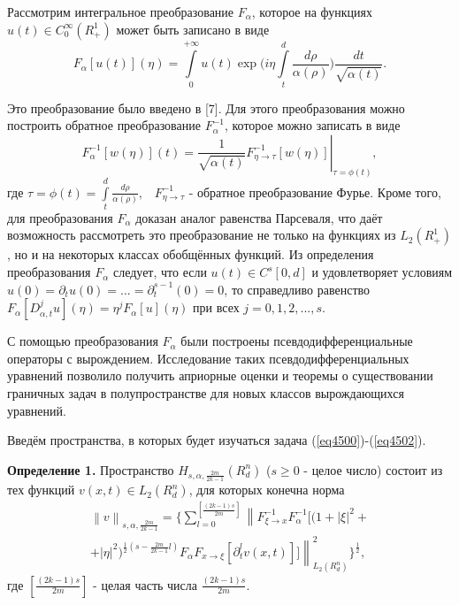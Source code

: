 Рассмотрим интегральное преобразование $F_\alpha $, которое на функциях
$u(t) \in C_0^\infty (R_ + ^1 )$ может быть записано в виде
\[
F_\alpha [u(t)](\eta ) = \int\limits_0^{ + \infty } {u(t)\exp (i\eta }
\int\limits_t^d {\frac{d\rho }{\alpha (\rho )}} )\frac{dt}{\sqrt {\alpha
(t)} }.
\]

Это преобразование было введено в [7]. Для этого преобразования можно
построить обратное преобразование $F_\alpha ^{ - 1} $, которое можно
записать в виде
$$F_\alpha ^{ - 1} [w(\eta )](t) = \left. {\frac{1}{\sqrt
{\alpha (t)} }F_{\eta \to \tau }^{ - 1} [w(\eta )]} \right|_{\tau = \phi
(t)} ,$$ где $\tau = \phi (t) = \int\limits_t^d {\frac{d\rho }{\alpha (\rho
)}} ,\,\,\,\,\,F_{\eta \to \tau }^{ - 1} $ - обратное преобразование Фурье.
Кроме того, для преобразования $F_\alpha $ доказан аналог равенства
Парсеваля, что даёт возможность рассмотреть это преобразование не только на
функциях из $L_2 (R_ + ^1 )$, но и на некоторых классах обобщённых функций.
Из определения преобразования $F_\alpha $ следует, что если $u\left( t
\right) \in C^s\left[ {0,d} \right]$ и удовлетворяет условиям $u\left( 0
\right) = \partial _t u\left( 0 \right) = ... = \partial _t^{s - 1} \left( 0
\right) = 0$,
то справедливо равенство $F_\alpha \left[ {D_{\alpha ,t}^j u} \right]\left(
\eta \right) = \eta ^jF_\alpha \left[ u \right]\left( \eta \right)$ при всех
$j = 0,1,2,...,s$.

С помощью преобразования $F_\alpha $ были построены псевдодифференциальные
операторы с вырождением. Исследование таких псевдодифференциальных уравнений
позволило получить априорные оценки и теоремы о существовании граничных
задач в полупространстве для новых классов вырождающихся уравнений.

Введём пространства, в которых будет изучаться задача (\ref{eq4500})-(\ref{eq4502}).

\textbf{Определение 1.} Пространство $H_{s,\alpha ,\frac{2m}{2k - 1}} (R_d^n
)$ ($s \geqslant 0$ - целое число) состоит из тех функций $v(x,t) \in L_2 (R_d^n
)$, для которых конечна норма
\begin{multline*}
	\left\| v \right\|_{s,\alpha ,\frac{2m}{2k - 1}} =
	\{
		\sum\limits_{l = 0}^{[\frac{(2k - 1)s}{2m}]}
		\left\|
			F_{\xi \to x}^{ - 1} F_\alpha ^{ - 1}
			[(1 + \left| \xi \right|^2 +
		\right. \\ + \left.
			\left| \eta \right|^2 )^{\frac{1}{2}(s -
			\frac{2m}{2k - 1}l)}F_\alpha F_{x \to \xi } [\partial _t^l v(x,t)]]
		\right\|_{L_2 (R_d^n )}^2
	\}
	^\frac{1}{2} ,
\end{multline*}
где $[\frac{(2k - 1)s}{2m}]$ - целая часть числа $\frac{(2k - 1)s}{2m}$.


